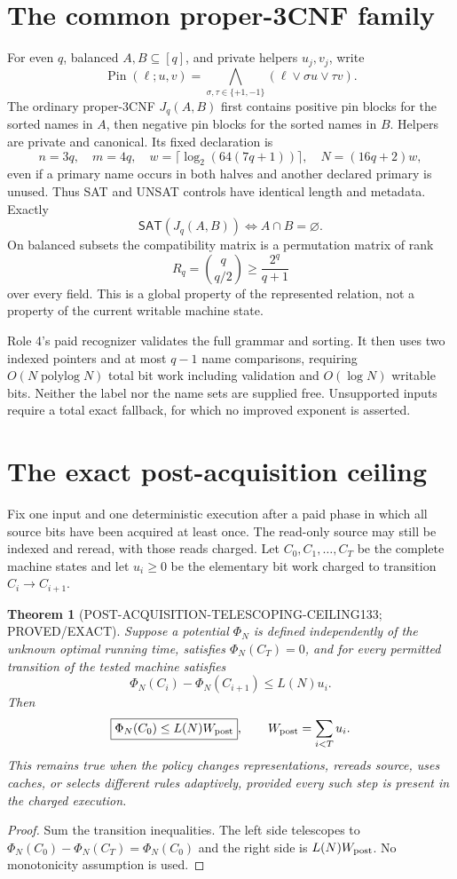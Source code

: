 \documentclass[11pt]{article}
\newtheorem{theorem}{Theorem}
\newcommand{\SAT}{\mathsf{SAT}}
\begin{document}
\section{The common proper-3CNF family}
For even $q$, balanced $A,B\subseteq[q]$, and private helpers $u_j,v_j$,
write
\[
 \operatorname{Pin}(\ell;u,v)=
 \bigwedge_{\sigma,\tau\in\{+1,-1\}}
 (\ell\vee \sigma u\vee\tau v).
\]
The ordinary proper-3CNF $J_q(A,B)$ first contains positive pin blocks for
the sorted names in $A$, then negative pin blocks for the sorted names in
$B$.  Helpers are private and canonical.  Its fixed declaration is
\[
 n=3q,\quad m=4q,\quad
 w=\lceil\log_2(64(7q+1))\rceil,\quad
 N=(16q+2)w,
\]
even if a primary name occurs in both halves and another declared primary is
unused.  Thus SAT and UNSAT controls have identical length and metadata.
Exactly
\[
 \SAT(J_q(A,B))\iff A\cap B=\varnothing.
\]
On balanced subsets the compatibility matrix is a permutation matrix of
rank
\[
 R_q=\binom q{q/2}\ge \frac{2^q}{q+1}
\]
over every field.  This is a global property of the represented relation,
not a property of the current writable machine state.

Role 4's paid recognizer validates the full grammar and sorting.  It then
uses two indexed pointers and at most $q-1$ name comparisons, requiring
$O(N\operatorname{polylog}N)$ total bit work including validation and
$O(\log N)$ writable bits.  Neither the label nor the name sets are supplied
free.  Unsupported inputs require a total exact fallback, for which no
improved exponent is asserted.

\section{The exact post-acquisition ceiling}
Fix one input and one deterministic execution after a paid phase in which
all source bits have been acquired at least once.  The read-only source may
still be indexed and reread, with those reads charged.  Let
$C_0,C_1,\ldots,C_T$ be the complete machine states and let $u_i\ge0$ be the
elementary bit work charged to transition $C_i\to C_{i+1}$.

\begin{theorem}[POST-ACQUISITION-TELESCOPING-CEILING133;
PROVED/EXACT]\label{thm:tel}
Suppose a potential $\Phi_N$ is defined independently of the unknown optimal
running time, satisfies $\Phi_N(C_T)=0$, and for every permitted transition
of the tested machine satisfies
\[
 \Phi_N(C_i)-\Phi_N(C_{i+1})\le L(N)u_i.
\]
Then
\[
 \boxed{\Phi_N(C_0)\le L(N)W_{\rm post}},
 \qquad W_{\rm post}=\sum_{i<T}u_i.
\]
This remains true when the policy changes representations, rereads source,
uses caches, or selects different rules adaptively, provided every such step
is present in the charged execution.
\end{theorem}
\begin{proof}
Sum the transition inequalities.  The left side telescopes to
$\Phi_N(C_0)-\Phi_N(C_T)=\Phi_N(C_0)$ and the right side is
$L(N)W_{\rm post}$.  No monotonicity assumption is used.
\end{proof}
\end{document}
